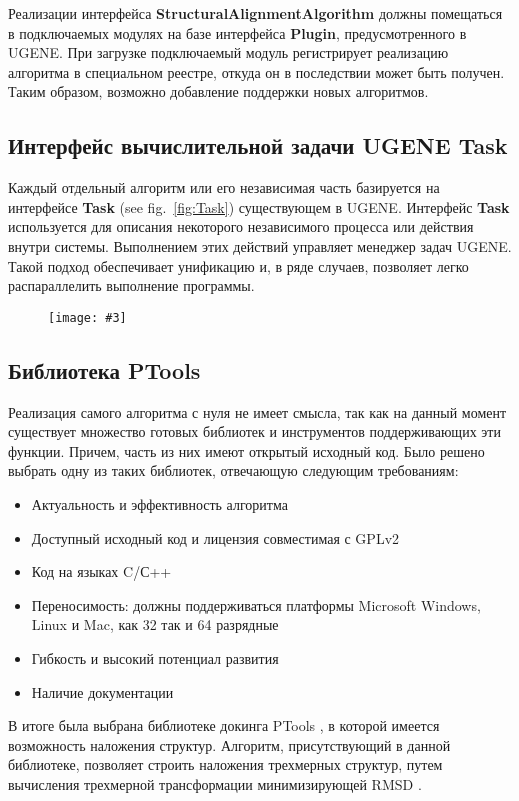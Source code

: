 \documentclass[a4paper, 12pt, titlepage, utf8]{extarticle}
\newenvironment{myfigure}[2]%
{\pushQED{\caption{#1} \label{#2}} %
    \begin{figure}[h!tb]\centering } %
{  \popQED %
    \end{figure}}
\newcommand{\includefigure}[3][]{
\begin{myfigure}{#2}{fig:#3}
    \texttt{[image: \#3]}
\end{myfigure}
}
\newcommand{\lookat}[1]{see fig.~\ref{#1}}
\newcommand{\class}{\textbf}
\begin{document}
\begin{original}
\begin{original}
\begin{original}
Реализации интерфейса \class{StructuralAlignmentAlgorithm} должны помещаться в
подключаемых модулях на базе интерфейса \class{Plugin}, предусмотренного в
UGENE. При загрузке подключаемый модуль регистрирует реализацию алгоритма в
специальном реестре, откуда он в последствии может быть получен. Таким образом,
возможно добавление поддержки новых алгоритмов.

\subsection{Интерфейс вычислительной задачи UGENE Task}
Каждый отдельный алгоритм или его независимая часть базируется на интерфейсе
\class{Task} (\lookat{fig:Task}) существующем в UGENE. Интерфейс \class{Task}
используется для описания некоторого независимого процесса или действия внутри
системы. Выполнением этих действий управляет менеджер задач UGENE. Такой подход
обеспечивает унификацию и, в ряде случаев, позволяет легко распараллелить
выполнение программы.

\includefigure[scale=0.6]{Интерфейс вычислительной задачи}{Task}

\subsection{Библиотека PTools}
Реализация самого алгоритма с нуля не имеет смысла, так как на данный момент
существует множество готовых библиотек и инструментов поддерживающих эти
функции. Причем, часть из них имеют открытый исходный код. Было решено выбрать
одну из таких библиотек, отвечающую следующим требованиям:

\begin{itemize}
    \item Актуальность и эффективность алгоритма
    \item Доступный исходный код и лицензия совместимая с GPLv2 \cite{gpl}
    \item Код на языках C/С++
    \item Переносимость: должны поддерживаться платформы Microsoft Windows,
Linux и Mac, как 32 так и 64 разрядные
    \item Гибкость и высокий потенциал развития
    \item Наличие документации
\end{itemize}

В итоге была выбрана библиотеке докинга PTools \cite{ptools}, в которой имеется
возможность наложения структур. Алгоритм, присутствующий в данной библиотеке,
позволяет строить наложения трехмерных структур, путем вычисления трехмерной
трансформации минимизирующей RMSD \cite{ptools-method}.


\end{original}
\end{original}
\end{original}
\end{document}
